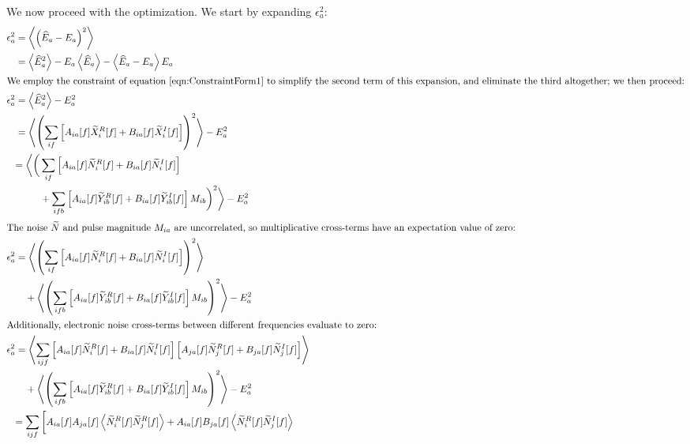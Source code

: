We now proceed with the optimization.  We start by expanding $\epsilon^2_a$:
\begin{align}
\epsilon^2_a &= \left< \left(\widehat{E}_a - E_a\right)^2\right> \\
%
&= \left< \widehat{E}^2_a \right> - E_a \left<\widehat{E}_a\right> - \left< \widehat{E}_a - E_a \right> E_a \\
%
\intertext{We employ the constraint of equation~\ref{eqn:ConstraintForm1} to simplify the second term of this expansion, and eliminate the third altogether; we then proceed:}
%
\epsilon^2_a &= \left< \widehat{E}^2_a \right> - E^2_a \\
%
&= \left< \left(\sum_{if}\left[ A_{ia}[f] \widetilde{X}_i^R[f] + B_{ia}[f] \widetilde{X}_i^I[f]\right]\right)^2\right> - E^2_a \\
%
& \begin{aligned}= \bigg< \bigg(&
  \sum_{if} \left[ A_{ia}[f] \widetilde{N}_i^R[f] + B_{ia}[f] \widetilde{N}_i^I[f]\right] \\
  & + \sum_{ifb} \left[ A_{ia}[f] \widetilde{Y}_{ib}^R[f] + B_{ia}[f] \widetilde{Y}_{ib}^I[f]\right]M_{ib}  \bigg)^2 \bigg> - E^2_a
\end{aligned} \\
%
\intertext{The noise $\widetilde{N}$ and pulse magnitude $M_{ia}$ are uncorrelated, so multiplicative cross-terms have an expectation value of zero:}
%
\epsilon^2_a &= \left< \left(\sum_{if} \left[ A_{ia}[f] \widetilde{N}_i^R[f] + B_{ia}[f] \widetilde{N}_i^I[f]\right]\right)^2\right> \nonumber \\
&\quad + \left<\left(\sum_{ifb} \left[ A_{ia}[f] \widetilde{Y}_{ib}^R[f] + B_{ia}[f] \widetilde{Y}_{ib}^I[f]\right]M_{ib} \right)^2 \right> - E^2_a \\
%
\intertext{Additionally, electronic noise cross-terms between different frequencies evaluate to zero:}
%
\epsilon^2_a &= \left< \sum_{ijf} \left[ A_{ia}[f] \widetilde{N}_i^R[f] + B_{ia}[f] \widetilde{N}_i^I[f]\right] \left[ A_{ja}[f] \widetilde{N}_j^R[f] + B_{ja}[f] \widetilde{N}_j^I[f]\right] \right> \nonumber \\
&\quad + \left<\left(\sum_{ifb} \left[ A_{ia}[f] \widetilde{Y}_{ib}^R[f] + B_{ia}[f] \widetilde{Y}_{ib}^I[f]\right]M_{ib} \right)^2 \right> - E^2_a \\
%
& \begin{aligned}
  = \sum_{ijf} \bigg[ & A_{ia}[f]A_{ja}[f] \left<\widetilde{N}_i^R[f]\widetilde{N}_j^R[f]\right> + A_{ia}[f]B_{ja}[f] \left<\widetilde{N}_i^R[f]\widetilde{N}_j^I[f]\right> \nonumber \\

\end{aligned}
\end{align}
